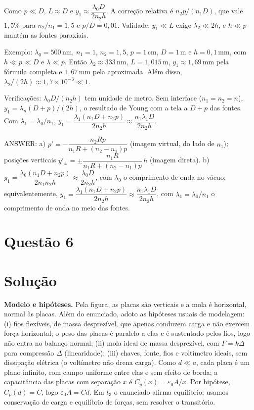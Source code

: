\documentclass{article}%
\begin{document}
Como $p\ll D$, $L\approx D$ e $y_1\approx\dfrac{\lambda_0D}{2n_2h}$. A correção relativa é $n_2p/(n_1D)$, que vale $1{,}5\%$ para $n_2/n_1=1{,}5$ e $p/D=0{,}01$. Validade: $y_1\ll L$ exige $\lambda_2\ll 2h$, e $h\ll p$ mantém as fontes paraxiais.

Exemplo: $\lambda_0=500\,\mathrm{nm}$, $n_1=1$, $n_2=1{,}5$, $p=1\,\mathrm{cm}$, $D=1\,\mathrm{m}$ e $h=0{,}1\,\mathrm{mm}$, com $h\ll p\ll D$ e $\lambda\ll p$. Então $\lambda_2\approx333\,\mathrm{nm}$, $L=1{,}015\,\mathrm{m}$, $y_1\approx1{,}69\,\mathrm{mm}$ pela fórmula completa e $1{,}67\,\mathrm{mm}$ pela aproximada. Além disso, $\lambda_2/(2h)\approx1{,}7\times10^{-3}\ll1$.

Verificações: $\lambda_0D/(n_2h)$ tem unidade de metro. Sem interface ($n_1=n_2=n$), $y_1=\lambda_n(D+p)/(2h)$, o resultado de Young com a tela a $D+p$ das fontes. Com $\lambda_1=\lambda_0/n_1$, $y_1=\dfrac{\lambda_1(n_1D+n_2p)}{2n_2h}\approx\dfrac{n_1\lambda_1D}{2n_2h}$.

ANSWER: a) $p'=-\dfrac{n_2Rp}{n_1R+(n_2-n_1)p}$ (imagem virtual, do lado de $n_1$); posições verticais $y'_\pm=\pm\dfrac{n_1R}{n_1R+(n_2-n_1)p}\,h$ (imagem direta). b) $y_1=\dfrac{\lambda_0(n_1D+n_2p)}{2n_1n_2h}\approx\dfrac{\lambda_0D}{2n_2h}$, com $\lambda_0$ o comprimento de onda no vácuo; equivalentemente, $y_1=\dfrac{\lambda_1(n_1D+n_2p)}{2n_2h}\approx\dfrac{n_1\lambda_1D}{2n_2h}$, com $\lambda_1=\lambda_0/n_1$ o comprimento de onda no meio das fontes.%
\newpage%
\section*{Questão 6}

\section*{Solução}

\textbf{Modelo e hipóteses.} Pela figura, as placas são verticais e a mola é horizontal, normal às placas. Além do enunciado, adoto as hipóteses usuais de modelagem: (i) fios flexíveis, de massa desprezível, que apenas conduzem carga e não exercem força horizontal; o peso das placas é paralelo a elas e é sustentado pelos fios, logo não entra no balanço normal; (ii) mola ideal de massa desprezível, com $F=k\Delta$ para compressão $\Delta$ (linearidade); (iii) chaves, fonte, fios e voltímetro ideais, sem dissipação elétrica (o voltímetro não drena carga). Como $d\ll a$, cada placa é um plano infinito, com campo uniforme entre elas e sem efeito de borda; a capacitância das placas com separação $x$ é $C_p(x)=\varepsilon_0A/x$. Por hipótese, $C_p(d)=C$, logo $\varepsilon_0A=Cd$. Em $t_3$ o enunciado afirma equilíbrio: usamos conservação de carga e equilíbrio de forças, sem resolver o transitório.
\end{document}
